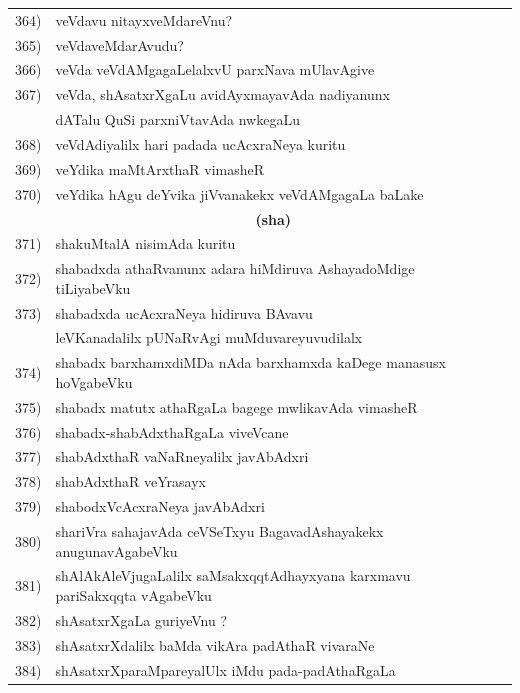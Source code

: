 {\begin{longtable}{@{}cp{7.4cm}r}
364) & veVdavu nitayxveMdareVnu? & \pageref{page133}\\
365) & veVdaveMdarAvudu? & \pageref{page132}\\
366) & veVda veVdAMgagaLelalxvU parxNava mUlavAgive & \pageref{page165}\\
367) & veVda, shAsatxrXgaLu avidAyxmayavAda nadiyanunx  & \\
     & dATalu QuSi parxniVtavAda nwkegaLu & \pageref{page42a}\\
 368) & veVdAdiyalilx hari padada ucAcxraNeya kuritu & \pageref{page149}\\
 369) & veYdika maMtArxthaR vimasheR & \pageref{page111}\\
 370) & veYdika hAgu deYvika jiVvanakekx veVdAMgagaLa baLake & \pageref{page191}\\[0.3cm]
      & \multicolumn{1}{c}{\textbf{(sha)}} & \\[0.3cm]
 371) &  shakuMtalA nisimAda kuritu & \pageref{page234}\\
 372) & shabadxda athaRvanunx adara hiMdiruva AshayadoMdige tiLiyabeVku & \pageref{page179}\\
 373) & shabadxda ucAcxraNeya hidiruva BAvavu & \\
      & leVKanadalilx pUNaRvAgi muMduvareyuvudilalx & \pageref{page181}\\
 374) &  shabadx barxhamxdiMDa nAda barxhamxda kaDege manasusx hoVgabeVku & \pageref{page161}\\
 375) & shabadx matutx athaRgaLa bagege mwlikavAda vimasheR & \pageref{page111}\\
 376) & shabadx-shabAdxthaRgaLa viveVcane  & \pageref{page113}\\
 377) & shabAdxthaR vaNaRneyalilx javAbAdxri  & \pageref{page112}\\
 378) & shabAdxthaR veYrasayx & \pageref{page112}\\
 379) & shabodxVcAcxraNeya javAbAdxri & \pageref{page124}\\
 380) & shariVra sahajavAda ceVSeTxyu BagavadAshayakekx anugunavAgabeVku & \pageref{80}\\
 381) & shAlAkAleVjugaLalilx saMsakxqqtAdhayxyana karxmavu pariSakxqqta vAgabeVku &\pageref{page53}\\
 382) & shAsatxrXgaLa guriyeVnu ? & \pageref{page93}\\
 383) & shAsatxrXdalilx baMda vikAra padAthaR vivaraNe & \pageref{page225}\\
 384) & shAsatxrXparaMpareyalUlx iMdu pada-padAthaRgaLa &  \\

\end{longtable}}

